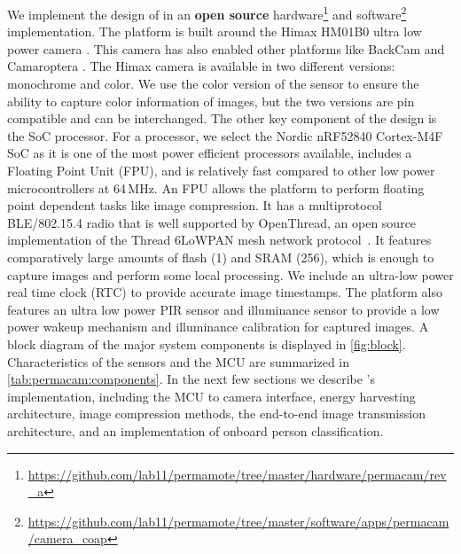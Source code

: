 We implement the design of \namec{} in an \textbf{open source}
hardware\footnote{\url{https://github.com/lab11/permamote/tree/master/hardware/permacam/rev_a}}
and software\footnote{\url{https://github.com/lab11/permamote/tree/master/software/apps/permacam/camera_coap}}
implementation. The platform is built around the Himax HM01B0 ultra low power camera \cite{hm01b0}. This camera has also enabled other platforms like BackCam \cite{josephson2019wireless} and Camaroptera \cite{nardello2019camaroptera}. The Himax camera is available in two different versions: monochrome and color. 
We use the color version of the sensor to ensure the ability to capture color information of images, but the two versions are pin compatible and can be interchanged. The other key component of the design is the SoC processor. 
For a processor, we select the Nordic nRF52840 Cortex-M4F SoC as it is one of the most power efficient processors available, includes a Floating Point Unit (FPU), and is relatively fast compared to other low power microcontrollers at 64\,MHz. 
An FPU allows the platform to perform floating point dependent tasks like image compression. 
It has a multiprotocol BLE/802.15.4 radio that is well supported by OpenThread, an open source implementation of the Thread 6LoWPAN mesh network protocol~\cite{openthread}.
It features comparatively large amounts of flash (1\ssi{\mega\byte}) and SRAM (256\ssi{\mega\byte}), which is enough to capture images and perform some local processing. 
We include an ultra-low power real time clock (RTC) to provide accurate image timestamps. 
The platform also features an ultra low power PIR sensor and illuminance sensor to provide a low power wakeup mechanism and illuminance calibration for captured images. 
A block diagram of the major system components is displayed in \cref{fig:block}. 
Characteristics of the sensors and the MCU are summarized in \cref{tab:permacam:components}. 
In the next few sections we describe \namec{}'s implementation, including the MCU to camera interface, energy harvesting architecture, image compression methods, the end-to-end image transmission architecture, and an implementation of onboard person classification.


